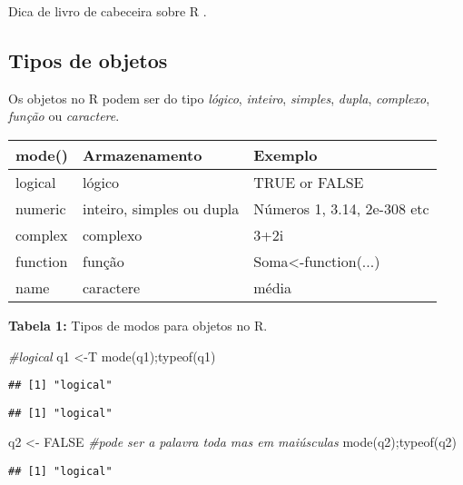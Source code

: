 \documentclass[
]{book}
\newenvironment{Shaded}{\begin{snugshade}}{\end{snugshade}}
\newcommand{\CommentTok}[1]{\textcolor[rgb]{0.56,0.35,0.01}{\textit{#1}}}
\newcommand{\ConstantTok}[1]{\textcolor[rgb]{0.00,0.00,0.00}{#1}}
\newcommand{\FunctionTok}[1]{\textcolor[rgb]{0.00,0.00,0.00}{#1}}
\newcommand{\NormalTok}[1]{#1}
\newcommand{\OtherTok}[1]{\textcolor[rgb]{0.56,0.35,0.01}{#1}}
\begin{document}
Dica de livro de cabeceira sobre R \citet{melloandpeternelli2013}.

\hypertarget{tipos-de-objetos}{%
\subsection{Tipos de objetos}\label{tipos-de-objetos}}

Os objetos no R podem ser do tipo \emph{lógico}, \emph{inteiro}, \emph{simples}, \emph{dupla}, \emph{complexo}, \emph{função} ou \emph{caractere}.

\begin{tabular}{l|l|l}
\hline
mode() & Armazenamento & Exemplo\\
\hline
logical & lógico & TRUE or FALSE\\
\hline
numeric & inteiro, simples ou dupla & Números 1, 3.14, 2e-308 etc\\
\hline
complex & complexo & 3+2i\\
\hline
function & função & Soma<-function(...)\\
\hline
name & caractere & média\\
\hline
\end{tabular}

\textbf{Tabela 1:} Tipos de modos para objetos no R.

\begin{Shaded}
\begin{Highlighting}[]
\CommentTok{\#logical}
\NormalTok{q1 }\OtherTok{\textless{}{-}}\NormalTok{T}
\FunctionTok{mode}\NormalTok{(q1);}\FunctionTok{typeof}\NormalTok{(q1)}
\end{Highlighting}
\end{Shaded}

\begin{verbatim}
## [1] "logical"
\end{verbatim}

\begin{verbatim}
## [1] "logical"
\end{verbatim}

\begin{Shaded}
\begin{Highlighting}[]
\NormalTok{q2 }\OtherTok{\textless{}{-}} \ConstantTok{FALSE} \CommentTok{\#pode ser a palavra toda mas em maiúsculas }
\FunctionTok{mode}\NormalTok{(q2);}\FunctionTok{typeof}\NormalTok{(q2)}
\end{Highlighting}
\end{Shaded}

\begin{verbatim}
## [1] "logical"
\end{verbatim}
\end{document}
